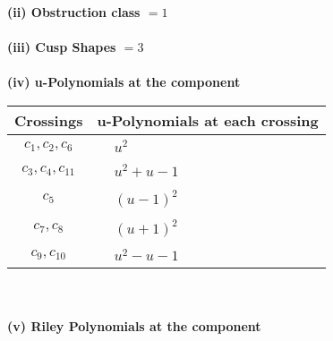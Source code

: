 \documentclass[1p]{elsarticle_modified}
\theoremstyle{definition}
\begin{document}
\flushleft \textbf{(ii) Obstruction class $= 1$}\\~\\
\flushleft \textbf{(iii) Cusp Shapes $= 3$}\\~\\
\newpage\renewcommand{\arraystretch}{1}
\flushleft \textbf{(iv) u-Polynomials at the component}\newline \\
\begin{tabular}{m{50pt}|m{274pt}}
Crossings & \hspace{64pt}u-Polynomials at each crossing \\
\hline $$\begin{aligned}c_{1},c_{2},c_{6}\end{aligned}$$&$\begin{aligned}
&u^2
\end{aligned}$\\
\hline $$\begin{aligned}c_{3},c_{4},c_{11}\end{aligned}$$&$\begin{aligned}
&u^2+u-1
\end{aligned}$\\
\hline $$\begin{aligned}c_{5}\end{aligned}$$&$\begin{aligned}
&(u-1)^2
\end{aligned}$\\
\hline $$\begin{aligned}c_{7},c_{8}\end{aligned}$$&$\begin{aligned}
&(u+1)^2
\end{aligned}$\\
\hline $$\begin{aligned}c_{9},c_{10}\end{aligned}$$&$\begin{aligned}
&u^2- u-1
\end{aligned}$\\
\hline
\end{tabular}\\~\\
\newpage\renewcommand{\arraystretch}{1}
\flushleft \textbf{(v) Riley Polynomials at the component}\newline \\
\end{document}
